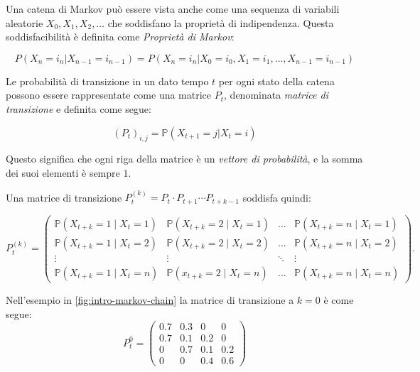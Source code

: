 Una catena di Markov può essere vista anche come una sequenza di variabili aleatorie $X_0, X_1, X_2, \dots$ che soddisfano la proprietà di indipendenza. Questa soddisfacibilità è definita come \textit{Proprietà di Markov}:

\begin{equation}
    P(X_n = i_n | X_{n - 1} = i_{n - 1}) = P(X_n = i_n | X_0 = i_0, X_1 = i_1, \dots, X_{n - 1} = i_{n - 1})
    \label{eq:intro-markov-property}
\end{equation}

Le probabilità di transizione in un dato tempo $t$ per ogni stato della catena possono essere rappresentate come una matrice $P_t$, denominata \textit{matrice di transizione} e definita come segue:

\begin{equation}
    (P_t)_{i,j} = \mathbb{P} (X_{t + 1} = j | X_t = i)
    \label{intro-extra-markov-matrix}
\end{equation}

Questo significa che ogni riga della matrice è un \textit{vettore di probabilità}, e la somma dei suoi elementi è sempre $1$. 

Una matrice di transizione $P_t^{(k)} = P_t \cdot P_{t + 1} \cdots P_{t + k - 1}$ soddisfa quindi: 

\begin{equation}
    P_t^{(k)} = \begin{pmatrix}
        \mathbb{P}(X_{t+k} = 1 \mid X_t = 1) & \mathbb{P}(X_{t+k} = 2 \mid X_t = 1) & \dots & \mathbb{P}(X_{t+k} = n \mid X_t = 1) \\
        \mathbb{P}(X_{t+k} = 1 \mid X_t = 2) & \mathbb{P}(X_{t+k} = 2 \mid X_t = 2) & \dots & \mathbb{P}(X_{t+k} = n \mid X_t = 2) \\
        \vdots & \vdots & \ddots & \vdots \\
        \mathbb{P}(X_{t+k} = 1 \mid X_t = n) & \mathbb{P}(x_{t+k} = 2 \mid X_t = n) & \dots & \mathbb{P}(X_{t+k} = n \mid X_t = n)
        \end{pmatrix}.
    \label{eq:intro-extra-markov-property}
\end{equation}

Nell'esempio in \autoref{fig:intro-markov-chain} la matrice di transizione a $k = 0$ è come segue:
\begin{equation}
    P_t^0 = \begin{pmatrix}
        0.7 & 0.3   & 0     & 0 \\
        0.7 & 0.1   & 0.2   & 0 \\
        0   & 0.7   & 0.1   & 0.2 \\
        0   & 0     & 0.4   & 0.6
    \end{pmatrix}
    \label{eq:intro-markov-tranmat}
\end{equation}

